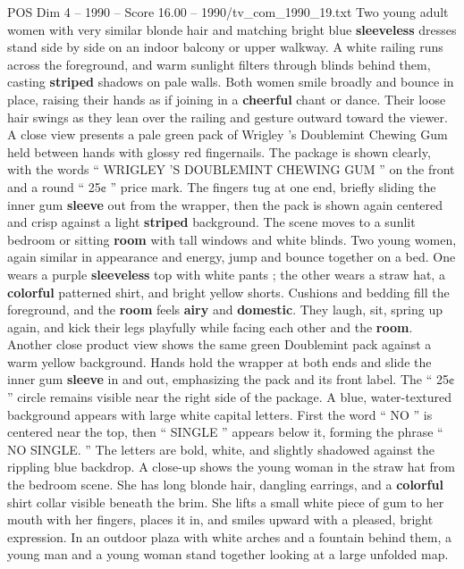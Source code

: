 \begin{textsample}{POS Dim 4 – 1990 – Score 16.00 – 1990/tv\_com\_1990\_19.txt}  \label{ex:f4_pos_071}
Two young adult women with very similar blonde hair and matching bright blue \textbf{sleeveless} dresses stand side by side on an indoor balcony or upper walkway.
A white railing runs across the foreground, and warm sunlight filters through blinds behind them, casting \textbf{striped} shadows on pale walls.
Both women smile broadly and bounce in place, raising their hands as if joining in a \textbf{cheerful} chant or dance.
Their loose hair swings as they lean over the railing and gesture outward toward the viewer.
A close view presents a pale green pack of Wrigley ’s Doublemint Chewing Gum held between hands with glossy red fingernails.
The package is shown clearly, with the words “ WRIGLEY ’S DOUBLEMINT CHEWING GUM ” on the front and a round “ 25¢ ” price mark.
The fingers tug at one end, briefly sliding the inner gum \textbf{sleeve} out from the wrapper, then the pack is shown again centered and crisp against a light \textbf{striped} background.
The scene moves to a sunlit bedroom or sitting \textbf{room} with tall windows and white blinds.
Two young women, again similar in appearance and energy, jump and bounce together on a bed.
One wears a purple \textbf{sleeveless} top with white pants ; the other wears a straw hat, a \textbf{colorful} patterned shirt, and bright yellow shorts.
Cushions and bedding fill the foreground, and the \textbf{room} feels \textbf{airy} and \textbf{domestic}.
They laugh, sit, spring up again, and kick their legs playfully while facing each other and the \textbf{room}.
Another close product view shows the same green Doublemint pack against a warm yellow background.
Hands hold the wrapper at both ends and slide the inner gum \textbf{sleeve} in and out, emphasizing the pack and its front label.
The “ 25¢ ” circle remains visible near the right side of the package.
A blue, water-textured background appears with large white capital letters.
First the word “ NO ” is centered near the top, then “ SINGLE ” appears below it, forming the phrase “ NO SINGLE. ” The letters are bold, white, and slightly shadowed against the rippling blue backdrop.
A close-up shows the young woman in the straw hat from the bedroom scene.
She has long blonde hair, dangling earrings, and a \textbf{colorful} shirt collar visible beneath the brim.
She lifts a small white piece of gum to her mouth with her fingers, places it in, and smiles upward with a pleased, bright expression.
In an outdoor plaza with white arches and a fountain behind them, a young man and a young woman stand together looking at a large unfolded map.

\end{textsample}
